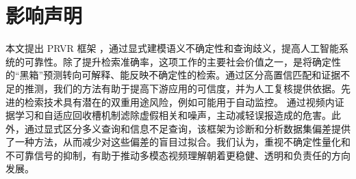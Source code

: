 \section*{影响声明}
本文提出 PRVR 框架 \modelname{}，通过显式建模语义不确定性和查询歧义，提高人工智能系统的可靠性。除了提升检索准确率，这项工作的主要社会价值之一，是将确定性的“黑箱”预测转向可解释、能反映不确定性的检索。通过区分高置信匹配和证据不足的推测，我们的方法有助于提高下游应用的可信度，并为人工复核提供依据。先进的检索技术具有潜在的双重用途风险，例如可能用于自动监控。\modelname{} 通过视频内证据学习和自适应回收槽机制滤除虚假相关和噪声，主动减轻误报造成的危害。此外，通过显式区分多义查询和信息不足查询，该框架为诊断和分析数据集偏差提供了一种方法，从而减少对这些偏差的盲目过拟合。我们认为，重视不确定性量化和不可靠信号的抑制，有助于推动多模态视频理解朝着更稳健、透明和负责任的方向发展。
